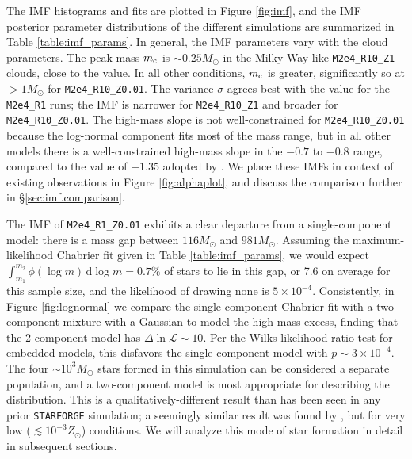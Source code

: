 \documentclass[apjl,twocolumn]{openjournal}
\begin{document}
The IMF histograms and fits are plotted in Figure \ref{fig:imf}, and the IMF posterior parameter distributions of the different simulations are summarized in Table \ref{table:imf_params}. In general, the IMF parameters vary with the cloud parameters. The peak mass $m_{\rm c}$ is $\sim 0.25 M_\odot$ in the Milky Way-like \texttt{M2e4\_R10\_Z1} clouds, close to the \citet{chabrier_imf} value. In all other conditions, $m_{\rm c}$ is greater, significantly so at $>1M_\odot$ for \texttt{M2e4\_R10\_Z0.01}. The variance $\sigma$ agrees best with the \citet{chabrier_imf} value for the \texttt{M2e4\_R1} runs; the IMF is narrower for \texttt{M2e4\_R10\_Z1} and broader for \texttt{M2e4\_R10\_Z0.01}. The high-mass slope is not well-constrained for \texttt{M2e4\_R10\_Z0.01} because the log-normal component fits most of the mass range, but in all other models there is a well-constrained high-mass slope in the $-0.7$ to $-0.8$ range, compared to the \citet{salpeter_slope} value of $-1.35$ adopted by \citet{chabrier_imf}. We place these IMFs in context of existing observations in Figure \ref{fig:alphaplot}, and discuss the comparison further in \S\ref{sec:imf.comparison}.

The IMF of \texttt{M2e4\_R1\_Z0.01} exhibits a clear departure from a single-component model: there is a mass gap between $116 M_\odot$ and $981M_\odot$. Assuming the maximum-likelihood Chabrier fit given in Table \ref{table:imf_params}, we would expect $\int_{m_1}^{m_2}\phi\left(\log m\right)\,\mathrm{d}\log m = 0.7\%$ of stars to lie in this gap, or 7.6 on average for this sample size, and the likelihood of drawing none is $5\times 10^{-4}$. Consistently, in Figure \ref{fig:lognormal} we compare the single-component Chabrier fit with a two-component mixture with a Gaussian to model the high-mass excess, finding that the 2-component model has $\Delta \ln \mathcal{L} \sim 10$. Per the Wilks likelihood-ratio test for embedded models, this disfavors the single-component model with $p \sim 3 \times 10^{-4}$. The four $\sim 10^{3} M_\odot$ stars formed in this simulation can be considered a separate population, and a two-component model is most appropriate for describing the distribution. This is a qualitatively-different result than has been seen in any prior \texttt{STARFORGE} simulation; a seemingly similar result was found by \citet{chon:2020.sms.formation}, but for very low ($\lesssim 10^{-3}Z_\odot$) conditions. We will analyze this mode of star formation in detail in subsequent sections.
\end{document}
